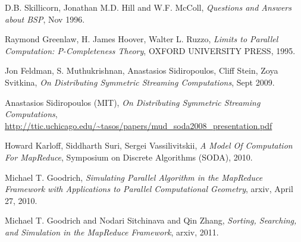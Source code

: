 \documentclass{article}
\begin{document}
\begin{thebibliography}{9}
D.B. Skillicorn, Jonathan M.D. Hill and W.F. McColl, \emph{Questions and Answers about BSP}, Nov 1996. 

Raymond Greenlaw, H. James Hoover, Walter L. Ruzzo, \emph{Limits to Parallel Computation: P-Completeness Theory}, OXFORD UNIVERSITY PRESS, 1995.

Jon Feldman, S. Muthukrishnan, Anastasios Sidiropoulos, Cliﬀ Stein, Zoya Svitkina, \emph{On Distributing Symmetric Streaming Computations}, Sept 2009. 

Anastasios Sidiropoulos (MIT), \emph{On Distributing Symmetric Streaming Computations}, \url{http://ttic.uchicago.edu/~tasos/papers/mud_soda2008_presentation.pdf}

Howard Karloff, Siddharth Suri, Sergei Vassilivitskii, \emph{A Model Of Computation For MapReduce}, 
Symposium on Discrete Algorithms (SODA), 2010. 

Michael T. Goodrich, \emph{Simulating Parallel Algorithm in the MapReduce Framework with Applications to Parallel Computational Geometry}, arxiv, April 27, 2010. 

Michael T. Goodrich and               Nodari Sitchinava and               Qin Zhang, 
\emph{Sorting, Searching, and Simulation in the MapReduce Framework}, arxiv, 2011. 

\end{thebibliography}
\end{document}
